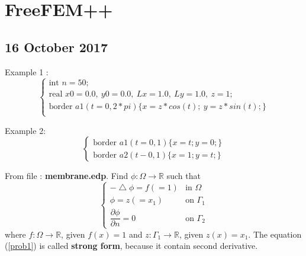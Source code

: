 \documentclass[a4paper,10pt]{article}
\begin{document}
\newpage
\section{FreeFEM++}
\subsection{16 October 2017}
Example 1 :
\begin{equation}\nonumber
\begin{cases}
\text{int } n=50;\\
\text{real } x0=0.0 ,\ y0=0.0 ,\ Lx=1.0 ,\ Ly=1.0 ,\ z=1; \\
\text{border } a1(t=0, 2*pi) \{x=z*cos(t); \ y=z*sin(t); \}\\
\end{cases}
\end{equation}

\vspace{4cm}

Example 2:
\begin{equation}\nonumber
\begin{cases}
\text{border } a1(t=0,1) \{ x=t;y=0; \}\\
\text{border } a2(t-0,1) \{ x=1;y=t; \}
\end{cases}
\end{equation}

\vspace{4cm}

From file : \textbf{membrane.edp}. Find $ \phi : \Omega \rightarrow \mathbb{R} $ such that
\begin{equation}\label{prob1}
\begin{cases}
-\bigtriangleup \phi = f (=1) & \text{in } \Omega \\
\phi = z (=x_{1}) & \text{on } \Gamma_{1} \\
\dfrac{\partial \phi}{\partial n} = 0 & \text{on } \Gamma_{2}
\end{cases}
\end{equation}
where $ f : \Omega \rightarrow \mathbb{R} $, given $ f(x)=1 $ and $ z : \Gamma_{1} \rightarrow \mathbb{R} $, given $ z(x)=x_{1} $. The equation (\ref{prob1}) is called \textbf{strong form}, because it contain second derivative.

\vspace{4cm}
\end{document}
